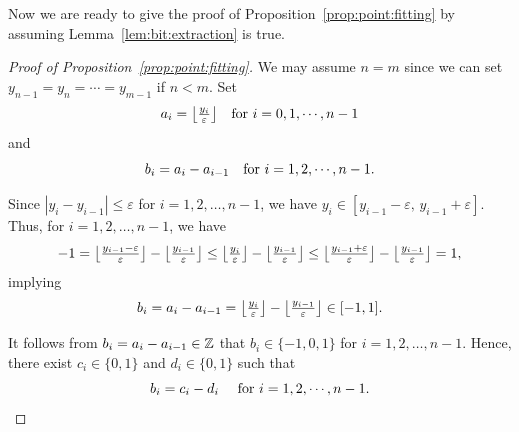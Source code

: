 \documentclass[nohyperref]{article}
\theoremstyle{plain}
\theoremstyle{definition}
\theoremstyle{remark}
\begin{document}
Now we are ready to give the proof of Proposition~\ref{prop:point:fitting} by assuming Lemma~\ref{lem:bit:extraction} is true.
\begin{proof}[Proof of Proposition~\ref{prop:point:fitting}]
	
	We may assume $n=m$ since we can set $y_{n-1}=y_{n}=\cdots=y_{m-1}$ if $n<m$. 	
	Set 
	\begin{equation*}
		a_{i}= \big\lfloor \tfrac{y_{i}}{\varepsilon} \big\rfloor 
		\quad \tn{for $i=0,1,\dotsc,n-1$}
	\end{equation*}
	and 
	\begin{equation*}
		b_{i}=a_{i}-a_{i-1}\quad \tn{for $i=1,2,\dotsc,n-1$.}
	\end{equation*}
	
	
	Since $|y_{i}-y_{i -1}|\le \varepsilon$ for $i=1,2,\dotsc,n-1$, we have
	$y_{i}\in [y_{i-1}-\varepsilon,\, y_{i-1}+\varepsilon]$. Thus, for $i=1,2,\dotsc,n-1$, we have
	\begin{equation*}
		-1
		=\big\lfloor \tfrac{y_{i-1}-\varepsilon}{\varepsilon}\big\rfloor-\big\lfloor \tfrac{y_{i-1}}{\varepsilon}\big\rfloor
		\le \big\lfloor \tfrac{y_{i}}{\varepsilon}\big\rfloor-\big\lfloor \tfrac{y_{i-1}}{\varepsilon}\big\rfloor
		\le \big\lfloor \tfrac{y_{i-1}+\varepsilon}{\varepsilon}\big\rfloor-\big\lfloor \tfrac{y_{i-1}}{\varepsilon}\big\rfloor
		=1,
	\end{equation*}
	implying 
	\begin{equation*}
		b_i=a_i-a_{i-1}=\big\lfloor \tfrac{y_{i}}{\varepsilon}\big\rfloor-\big\lfloor \tfrac{y_{i-1}}{\varepsilon}\big\rfloor\in [-1,1].
	\end{equation*}
	
	
	It follows from $b_i=a_i-a_{i-1}\in\Z$ that
	$b_{i}\in \{-1,0,1\}$ for $i=1,2,\dotsc,n-1$.
	Hence, there exist $c_{i}\in\{0,1\}$ and $d_{i }\in\{0,1\}$ such that 
	\begin{equation*}
		b_{i}=c_{i}-d_{i}\quad \tn{ for $i=1,2,\dotsc,n-1$.}
	\end{equation*}
	

\end{proof}
\end{document}
